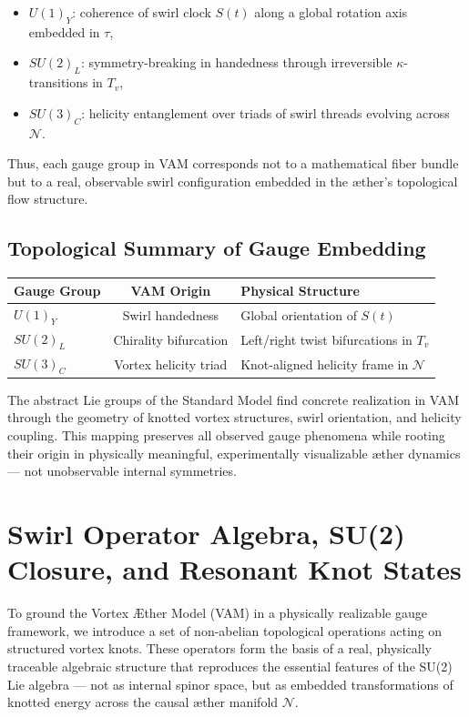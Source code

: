 \documentclass[12pt]{article}
\begin{document}
\begin{itemize}
    \item \textbf{$U(1)_Y$}: coherence of swirl clock $S(t)$ along a global rotation axis embedded in $\tau$,
    \item \textbf{$SU(2)_L$}: symmetry-breaking in handedness through irreversible $\kappa$-transitions in $T_v$,
    \item \textbf{$SU(3)_C$}: helicity entanglement over triads of swirl threads evolving across $\mathcal{N}$.
\end{itemize}

Thus, each gauge group in VAM corresponds not to a mathematical fiber bundle but to a real, observable swirl configuration embedded in the æther’s topological flow structure.

\subsection{Topological Summary of Gauge Embedding}

\begin{center}
\begin{tabular}{|l|c|l|}
\hline
\textbf{Gauge Group} & \textbf{VAM Origin} & \textbf{Physical Structure} \\
\hline
$U(1)_Y$ & Swirl handedness & Global orientation of $S(t)$ \\
$SU(2)_L$ & Chirality bifurcation & Left/right twist bifurcations in $T_v$ \\
$SU(3)_C$ & Vortex helicity triad & Knot-aligned helicity frame in $\mathcal{N}$ \\
\hline
\end{tabular}
\end{center}

The abstract Lie groups of the Standard Model find concrete realization in VAM through the geometry of knotted vortex structures, swirl orientation, and helicity coupling. This mapping preserves all observed gauge phenomena while rooting their origin in physically meaningful, experimentally visualizable æther dynamics — not unobservable internal symmetries.


\section{Swirl Operator Algebra, SU(2) Closure, and Resonant Knot States}

To ground the Vortex \AE{}ther Model (VAM) in a physically realizable gauge framework, we introduce a set of non-abelian topological operations acting on structured vortex knots. These operators form the basis of a real, physically traceable algebraic structure that reproduces the essential features of the SU(2) Lie algebra — not as internal spinor space, but as embedded transformations of knotted energy across the causal æther manifold \( \mathcal{N} \).
\end{document}
